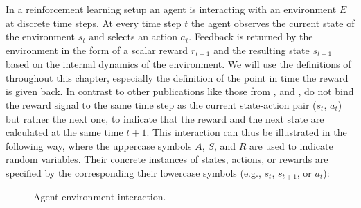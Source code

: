 In a reinforcement learning setup an agent is interacting with an environment $E$ at discrete time steps. At every time step $t$ the agent observes the current state of the environment $s_t$ and selects an action $a_t$. Feedback is returned by the environment in the form of a scalar reward $r_{t+1}$ and the resulting state $s_{t+1}$ based on the internal dynamics of the environment. We will use the definitions of \cite{Sutton1998} throughout this chapter, especially the definition of the point in time the reward is given back. In contrast to other publications like those from \cite{zare2021continuous}, \cite{wiering2012reinforcement} and \cite{lillicrap2019continuous}, \cite{Sutton1998} do not bind the reward signal to the same time step as the current state-action pair ($s_t$, $a_t$) but rather the next one, to indicate that the reward and the next state are calculated at the same time $t+1$.
This interaction can thus be illustrated in the following way, where the uppercase symbols $A$, $S$, and $R$ are used to indicate random variables. Their concrete instances of states, actions, or rewards are specified by the corresponding their lowercase symbols (e.g., $s_t$, $s_{t+1}$, or $a_t$):
\begin{figure}[H]
    \centering
    \hspace*{1cm}%
    \caption{Agent-environment interaction.}
    \label{fig:rlEnvironment}
\end{figure}



